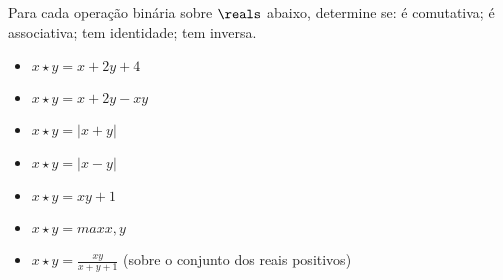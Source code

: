 \begin{exercise}
	Para cada operação binária sobre $\reals$ abaixo, determine se: é comutativa; é associativa; tem identidade; tem inversa.
	\begin{itemize}
		\item $x \star y = x + 2y + 4$   
		\item $x \star y = x + 2y - xy$
		\item $x \star y = |x + y|$
		\item $x \star y = |x - y|$
		\item $x \star y = xy + 1$
		\item $x \star y = max{x, y}$
		\item $x \star y = \frac{xy}{x + y + 1}$ (sobre o conjunto dos reais positivos)
	\end{itemize}
\end{exercise}
